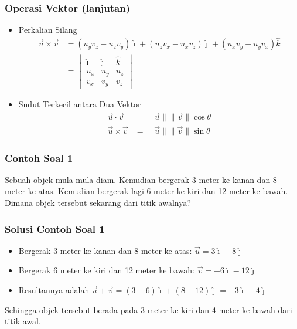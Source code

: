 \documentclass{beamer}
\begin{document}
\begin{frame}
\frametitle{Operasi Vektor (lanjutan)}
\begin{itemize}
   \item Perkalian Silang
       \begin{align*}
           \vec{u} \times \vec{v} &= (u_yv_z - u_zv_y)\hat{\imath} + (u_zv_x - u_xv_z)\hat{\jmath} + (u_xv_y - u_yv_x)\hat{k} \\
                                  &= \begin{vmatrix}
                                       \hat{\imath} & \hat{\jmath} & \hat{k} \\
                                       u_x & u_y & u_z \\
                                       v_x & v_y & v_z
                                     \end{vmatrix}
       \end{align*}
   \item Sudut Terkecil antara Dua Vektor
       \begin{align*}
           \vec{u} \cdot \vec{v} &= \|\vec{u}\|\|\vec{v}\| \cos\theta \\
           \vec{u} \times \vec{v} &= \|\vec{u}\|\|\vec{v}\| \sin\theta
       \end{align*}
\end{itemize}
\end{frame}

\begin{frame}
\frametitle{Contoh Soal 1}
Sebuah objek mula-mula diam. Kemudian bergerak 3 meter ke kanan dan 8 meter ke atas. Kemudian bergerak lagi 6 meter ke kiri dan 12 meter ke bawah. Dimana objek tersebut sekarang dari titik awalnya?
\end{frame}

\begin{frame}
\frametitle{Solusi Contoh Soal 1}
\begin{itemize}
   \item Bergerak 3 meter ke kanan dan 8 meter ke atas: $\vec{u} = 3\hat{\imath} + 8\hat{\jmath}$
   \item Bergerak 6 meter ke kiri dan 12 meter ke bawah: $\vec{v} = -6\hat{\imath} - 12\hat{\jmath}$
   \item Resultannya adalah $\vec{u} + \vec{v} = (3 - 6)\hat{\imath} + (8 - 12)\hat{\jmath} = -3\hat{\imath} - 4\hat{\jmath}$
\end{itemize}
Sehingga objek tersebut berada pada 3 meter ke kiri dan 4 meter ke bawah dari titik awal.
\end{frame}
\end{document}
